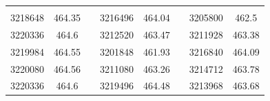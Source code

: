 \documentclass[12pt]{mwart}
\begin{document}
	\begin{table}[H]
	\centering
	\begin{tabular}{cclcclcc}
		\cellcolor[HTML]{4472C4}{\color[HTML]{FFFFFF} $t_c$ [$\mathrm{\mu s}$]} & \cellcolor[HTML]{4472C4}{\color[HTML]{FFFFFF} $C$ [$\mathrm{\mu F}$]} &  & \cellcolor[HTML]{4472C4}{\color[HTML]{FFFFFF} $t_c$ [$\mathrm{\mu s}$]} & \cellcolor[HTML]{4472C4}{\color[HTML]{FFFFFF} $C$ [$\mathrm{\mu F}$]} &  & \cellcolor[HTML]{4472C4}{\color[HTML]{FFFFFF} $t_c$ [$\mathrm{\mu s}$]} & \cellcolor[HTML]{4472C4}{\color[HTML]{FFFFFF} $C$ [$\mathrm{\mu F}$]} \\
		3218648                                                  & 464.35                                                        &  & 3216496                                                  & 464.04                                                        &  & 3205800                                                  & 462.5                                                         \\
		3220336                                                  & 464.6                                                         &  & 3212520                                                  & 463.47                                                        &  & 3211928                                                  & 463.38                                                        \\
		3219984                                                  & 464.55                                                        &  & 3201848                                                  & 461.93                                                        &  & 3216840                                                  & 464.09                                                        \\
		3220080                                                  & 464.56                                                        &  & 3211080                                                  & 463.26                                                        &  & 3214712                                                  & 463.78                                                        \\
		3220336                                                  & 464.6                                                         &  & 3219496                                                  & 464.48                                                        &  & 3213968                                                  & 463.68                                                        \\

\end{tabular}
\end{table}
\end{document}
